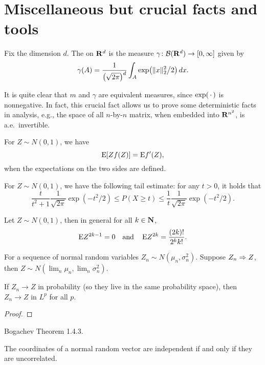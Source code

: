 \section{Miscellaneous but crucial facts and tools}
\begin{defn}
    Fix the dimension $d$. The  on $\mathbf{R}^d$ is the measure $\gamma\colon \mathcal{B}(\mathbf{R}^d) \to [0,\infty]$ given by \[
        \gamma(A) = \frac{1}{\bigl(\sqrt{2\pi}\bigr)^d} \int_A \exp\bigl(\lVert x \rVert^2_2 \big/ 2\bigr)\,dx.
    \]
\end{defn}

It is quite clear that $m$ and $\gamma$ are equivalent measures, since $\exp(\,\cdot\,)$ is nonnegative. In fact, this crucial fact allows us to prove some deterministic facts in analysis, e.g., the space of all $n$-by-$n$ matrix, when embedded into $\mathbf{R}^{n^2}$, is a.e.\ invertible.

\begin{fact}
    For $Z \sim N(0,1)$, we have \[
        \mathop{}\!\mathrm{E}[Z f(Z)] = \mathop{}\!\mathrm{E} f'(Z),
    \] when the expectations on the two sides are defined.
\end{fact}

\begin{prop}
    For $Z \sim N(0,1)$, we have the following tail estimate: for any $t > 0$, it holds that \[
        \frac{t}{t^2+1} \frac{1}{\sqrt{2\pi }} \exp(-t^2 / 2) \leq P(X \geq t) \leq \frac{1}{t} \frac{1}{\sqrt{2\pi }} \exp(-t^2 / 2).
    \]
\end{prop}

Let $Z \sim N(0,1)$, then in general for all $k \in \mathbf{N}$, \[
    \mathop{}\!\mathrm{E} Z^{2k - 1} = 0\quad \text{and}\quad \mathop{}\!\mathrm{E} Z^{2k} = \frac{(2k)!}{2^k k!}.
\]

\begin{prop}
For a sequence of normal random variables $Z_n \sim N(\mu_n, \sigma_n^2)$. Suppose $Z_n \Rightarrow Z$, then $Z \sim N(\lim_n \mu_n, \lim_n \sigma_n^2)$.

If $Z_n \to Z$ in probability (so they live in the same probability space), then $Z_n \to Z$ in $L^p$ for all $p$.
\end{prop}

\begin{proof}
    
\end{proof}


Bogachev Theorem 1.4.3.

The coordinates of a normal random vector are independent if and only if they are uncorrelated.


